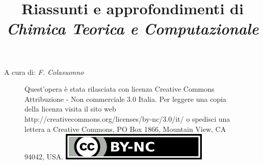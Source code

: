 \documentclass[oneside]{amsbook}
\numberwithin{section}{chapter}
\numberwithin{equation}{section}
\numberwithin{figure}{section}
\begin{document}
\begin{titlepage}
\title{Riassunti e approfondimenti di\\ \textit{\Huge Chimica Teorica e Computazionale}}

\end{titlepage}
\maketitle

 A cura di: \textit{\Large F. Colasuonno}
\begin{figure}
{\small Quest'opera è stata rilasciata con licenza Creative Commons Attribuzione - Non commerciale 3.0 Italia. Per leggere una copia della licenza visita il sito web http://creativecommons.org/licenses/by-nc/3.0/it/ o spedisci una lettera a Creative Commons, PO Box 1866, Mountain View, CA 94042, USA.}
\includegraphics[scale=1.0]{licenza}
\end{figure}

\tableofcontents{}
\end{document}
